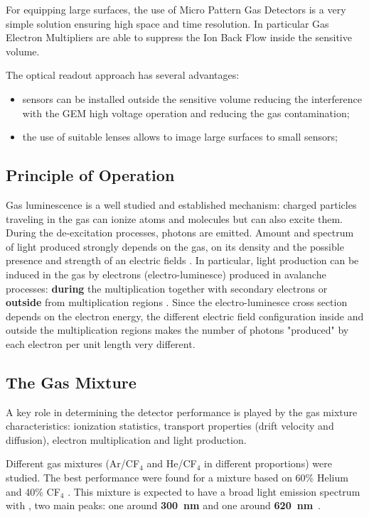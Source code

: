 \documentclass[review]{elsarticle}
\begin{document}
For equipping large surfaces, the use of Micro Pattern Gas Detectors
is a very simple solution ensuring high space and time resolution.
In particular Gas Electron Multipliers are able to suppress
the Ion Back Flow inside the sensitive volume. 

The optical readout approach has several advantages:
\begin{itemize}
\item sensors can be installed  outside the 
sensitive volume reducing the interference with  the GEM high voltage operation and reducing  the gas contamination;
\item the use of suitable lenses allows to 
image   large surfaces to small sensors;
\end{itemize}



\subsection{Principle of Operation}
Gas luminescence is a well studied and established mechanism: charged particles traveling in the gas can ionize atoms and molecules but can also excite them. During the de-excitation processes, photons are emitted. Amount and spectrum of light produced strongly depends on the gas, on its density and the possible presence and strength of an electric fields \cite{bib:Fraga}.
In particular, light production can be induced in the gas by electrons (electro-luminesce) produced in avalanche processes: {\bf during} the  multiplication together with secondary electrons or {\bf outside} from multiplication regions \cite{bib:lumi}. 
Since the electro-luminesce cross section depends on the electron energy, the different electric field configuration inside and outside the multiplication regions makes the number of photons "produced" by each electron per unit length very different.

\subsection{The Gas Mixture}

A key role in determining the detector performance is played by the gas mixture characteristics: ionization statistics, transport properties (drift velocity and diffusion), electron multiplication and light production.

Different gas mixtures (Ar/CF$_4$ and He/CF$_{4}$ in different proportions) were studied. The best performance were found for a mixture based on 60\% Helium and 40\% CF$_{4}$ \cite{bib:fe55New}.
This mixture is expected to have a broad light emission spectrum with , two main peaks: one around {\bf 300~nm} and one around {\bf 620~nm}~\cite{bib:Fraga}.
\end{document}
